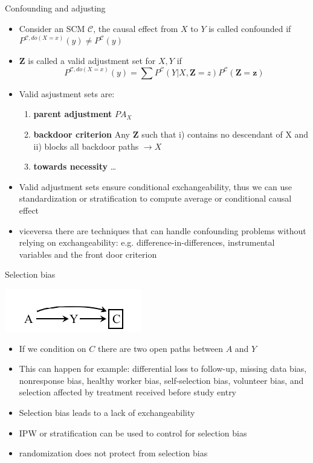 \documentclass{beamer}
\begin{document}
\begin{frame}{Confounding and adjusting}
  \begin{itemize}
    \item<1-> Consider an SCM $\mathcal{C}$, the causal effect from $X$ to $Y$ is called confounded if $P^{\mathcal{C}, do(X = x)}(y) \neq P^{\mathcal{C}}(y)$ 
    \item<2-> $\mathbf{Z}$ is called a valid adjustment set for $X,Y$ if 
      \[ P^{\mathcal{C}, do(X = x)}(y) = \sum P^{\mathcal{C}}(Y| X, \mathbf{Z} = z)P^{\mathcal{C}}(\mathbf{Z}=\mathbf{z}) \]
    \item<3-> Valid asjustment sets are: 
      \begin{enumerate}
	\item \textbf{parent adjustment} $PA_X$ 
	\item \textbf{backdoor criterion} Any $\mathbf{Z}$ such that i) contains no descendant of X and ii) blocks all backdoor paths $\rightarrow X$ 
	\item \textbf{towards necessity}  \ldots 
      \end{enumerate}
    \item<4-> Valid adjustment sets ensure conditional exchangeability, thus we can use standardization or stratification to compute average or conditional causal effect 
    \item<5-> viceversa there are techniques that can handle confounding problems without relying on exchangeability: e.g. difference-in-differences, instrumental variables and 
      the front door criterion
  \end{itemize}
\end{frame}

\begin{frame}{Selection bias} 
  \begin{center}
    \includegraphics[scale=1]{selection}
  \end{center}
  \begin{itemize}
    \item<1-> If we condition on $C$ there are two open paths between $A$ and $Y$ 
    \item<2-> This can happen for example: differential loss to follow-up, missing data bias, nonresponse bias, healthy worker bias, self-selection bias, volunteer bias, 
      and selection aﬀected by treatment received before study entry 
    \item<3-> Selection bias leads to a lack of exchangeability
    \item<4-> IPW or stratification can be used to control for selection bias 
    \item<5-> randomization does not protect from selection bias 
  \end{itemize}
\end{frame}
\end{document}
